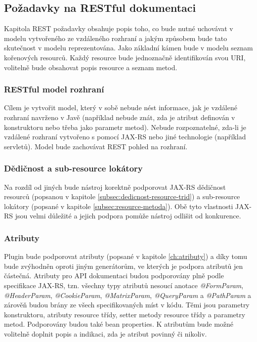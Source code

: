 \documentclass[11pt,twoside,a4paper]{book}
\begin{document}
\subsection{Požadavky na RESTful dokumentaci}
\label{subsec:pozadavky-na-restful-doc}

Kapitola REST požadavky obsahuje popis toho, co bude nutné uchovávat v modelu
vytvořeného ze vzdáleného rozhraní a jakým způsobem bude tato skutečnost v modelu
reprezentována. Jako základní kámen bude v modelu seznam kořenových resourců. Každý
resource bude jednoznačně identifikován svou URI, volitelně bude obsahovat popis resource a
seznam metod.

\subsubsection{RESTful model rozhraní}

Cílem je vytvořit model, který v sobě nebude nést informace, jak je vzdálené rozhraní
navrženo v Javě (například nebude znát, zda je atribut definován v konstruktoru nebo třeba
jako parametr metod). Nebude rozpoznatelné, zda-li je vzdálené rozhraní vytvořeno s pomocí
JAX-RS nebo jiné technologie (například servletů). Model bude zachovávat REST pohled na
rozhraní.

\subsubsection{Dědičnost a sub-resource lokátory}

Na rozdíl od jiných bude nástroj korektně podporovat JAX-RS dědičnost resourců (popsanou
v kapitole \ref{subsec:dedicnost-resource-trid}) a sub-resource lokátory
(popsané v kapitole \ref{subsec:resource-metoda}). Obě tyto vlastnosti JAX-RS jsou
velmi důležité a jejich podpora pomůže nástroj odlišit od konkurence.

\subsubsection{Atributy}

Plugin bude podporovat atributy (popsané v kapitole \ref{ch:atributy}) a díky
tomu bude zvýhodněn oproti jiným generátorům, ve kterých je podpora atributů jen částečná. Atributy pro API
dokumentaci budou podporovány plně podle specifikace JAX-RS, tzn. všechny typy atributů
nesoucí anotace {\em @FormParam}, {\em @HeaderParam}, {\em @CookieParam}, {\em @MatrixParam},
{\em @QueryParam} a {\em @PathParam} a zárověň budou brány ze všech specifikovaných míst v
kódu. Těmi jsou parametry konstruktoru, atributy resource třídy, setter metody
resource třídy a parametry metod. Podporovány budou také bean properties. K atributům bude možné
volitelně doplnit popis a indikaci, zda je atribut povinný či nikoliv.
\end{document}
